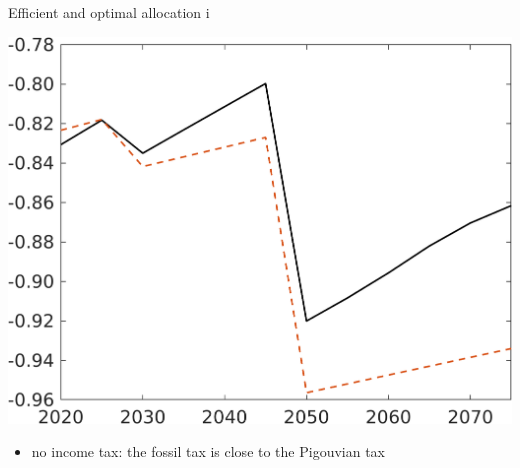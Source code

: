 \documentclass[11pt,aspectratio=169]{beamer}
\begin{document}
\begin{frame}{Efficient and optimal allocation i}
\begin{minipage}[]{0.32\textwidth}
		\includegraphics[width=1\textwidth]{../codding_model/own_basedOnFried/optimalPol_elastS_DisuSci/figures/all_1705/SWF_CompEffOPT_T_NoTaus_noopt_spillover0_noskill0_sep1_BN0_ineq0_red0_xgrowth0_zero0_countec0_etaa0.79_lgd0.png}
	\end{minipage}

\vspace{6mm}
\begin{itemize}
	\item no income tax: the fossil tax is close to the Pigouvian tax
\end{itemize}
\end{frame}
\end{document}
